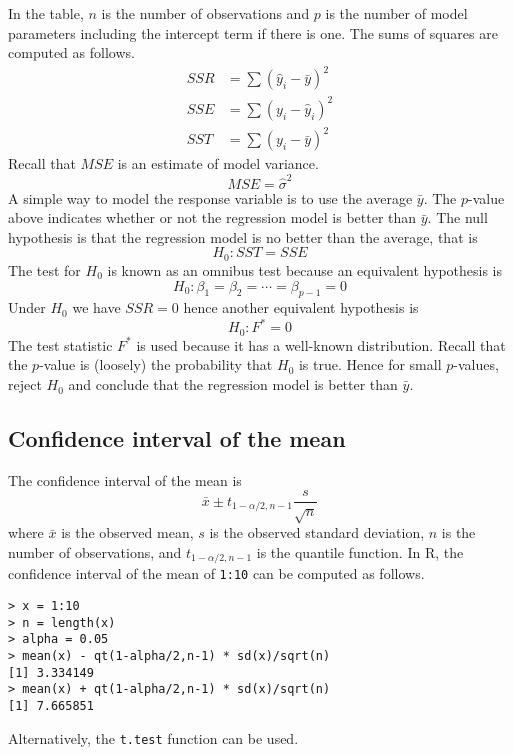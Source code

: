 \documentclass[11pt]{article}
\begin{document}
In the table, $n$ is the number of observations and $p$ is the
number of model parameters including the intercept term
if there is one.
The sums of squares are computed as follows.
\begin{align*}
SSR&=\sum(\hat y_i-\bar y)^2\\
SSE&=\sum(y_i-\hat y_i)^2\\
SST&=\sum(y_i-\bar y)^2
\end{align*}
Recall that $MSE$ is an estimate of model variance.
\[
MSE=\hat\sigma^2
\]
A simple way to model the response variable is to use the average $\bar y$.
The $p$-value above indicates whether or not the regression model
is better than $\bar y$.
The null hypothesis is that the regression model is no better
than the average, that is
\[
H_0:SST=SSE
\]
The test for $H_0$ is known as an omnibus test because an
equivalent hypothesis is
\[
H_0:\beta_1=\beta_2=\cdots=\beta_{p-1}=0
\]
Under $H_0$ we have $SSR=0$ hence another
equivalent hypothesis is
\[
H_0:F^*=0
\]
The test statistic $F^*$ is used
because it has a well-known distribution.
Recall that the $p$-value is (loosely) the probability
that $H_0$ is true.
Hence for small $p$-values, reject $H_0$ and
conclude that the regression model is better than $\bar y$.

\subsection*{Confidence interval of the mean}
The confidence interval of the mean is
\[
\bar x\pm t_{1-\alpha/2, n-1}\frac{s}{\sqrt n}
\]
where $\bar x$ is the observed mean,
$s$ is the observed standard deviation,
$n$ is the number of observations,
and $t_{1-\alpha/2, n-1}$ is the quantile function.
In R, the confidence interval of the mean of \verb$1:10$
can be computed as follows.

\begin{Verbatim}
> x = 1:10
> n = length(x)
> alpha = 0.05
> mean(x) - qt(1-alpha/2,n-1) * sd(x)/sqrt(n)
[1] 3.334149
> mean(x) + qt(1-alpha/2,n-1) * sd(x)/sqrt(n)
[1] 7.665851
\end{Verbatim}

Alternatively, the \verb$t.test$ function can be used.
\end{document}
